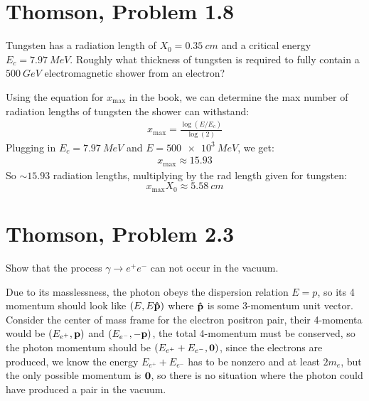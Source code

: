\documentclass[12pt]{article}
\begin{document}
\section{Thomson, Problem 1.8}
\begin{problem}
  Tungsten has a radiation length of $X_0=\SI{0.35}{cm}$ and a critical energy $E_c=\SI{7.97}{MeV}$. Roughly what thickness of tungsten is required to fully contain a $\SI{500}{GeV}$ electromagnetic shower from an electron?
\end{problem}
Using the equation for $x_{\text{max}}$ in the book, we can determine the max number of radiation lengths of tungsten the shower can withstand:
\begin{align*}
  x_{\text{max}}=\frac{\log(E/E_c)}{\log(2)}
\end{align*}
Plugging in $E_c=\SI{7.97}{MeV}$ and $E=\SI{500e3}{MeV}$, we get:
\begin{align*}
  x_{\text{max}}\approx15.93
\end{align*}
So $\sim15.93$ radiation lengths, multiplying by the rad length given for tungsten:
\begin{equation}
  \label{eq:p4}
  \boxed{x_{\text{max}}X_0\approx\SI{5.58}{cm}}
\end{equation}

\section{Thomson, Problem 2.3}
\begin{problem}
  Show that the process $\gamma\to e^+e^-$ can not occur in the vacuum.
\end{problem}
Due to its masslessness, the photon obeys the dispersion relation $E=p$, so its 4 momentum should look like $(E,E\vu{p})$ where $\vu{p}$ is some 3-momentum unit vector. Consider the center of mass frame for the electron positron pair, their 4-momenta would be $(E_{e^+},\vb{p})$ and $(E_{e^-},-\vb{p})$, the total 4-momentum must be conserved, so the photon momentum should be $(E_{e^+}+E_{e^-},\vb{0})$, since the electrons are produced, we know the energy $E_{e^+}+E_{e^-}$ has to be nonzero and at least $2m_e$, but the only possible momentum is $\vb{0}$, so there is no situation where the photon could have produced a pair in the vacuum.
\end{document}
